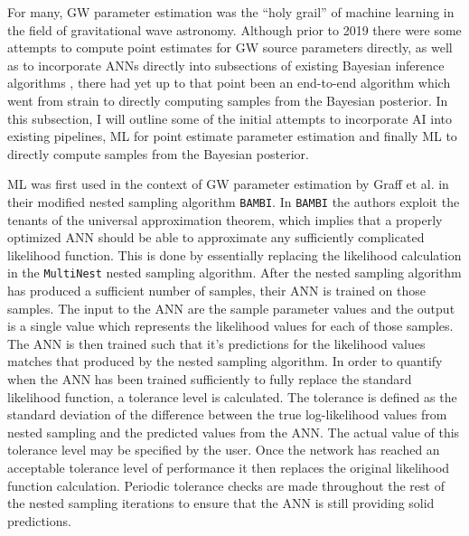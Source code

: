 %
%

For many, \ac{GW} parameter estimation was the ``holy grail'' of machine learning in the field of gravitational wave astronomy. Although prior to 2019 there were some attempts to compute point estimates for \ac{GW} source parameters directly, as well as to incorporate \ac{ANN}s directly into subsections of existing Bayesian inference algorithms \cite{10.1111/j.1365-2966.2011.20288.x}, there had yet up to that point been an end-to-end algorithm which went from strain to directly computing samples from the Bayesian posterior. In this subsection, I will outline some of the initial attempts to incorporate AI into existing pipelines, \ac{ML} for point estimate parameter estimation and finally \ac{ML} to directly compute samples from the Bayesian posterior.

%

\ac{ML} was first used in the context of \ac{GW} parameter estimation by Graff et al. in their modified nested sampling algorithm \texttt{BAMBI}. In \texttt{BAMBI} the authors exploit the tenants of the universal approximation theorem, which implies that a properly optimized \ac{ANN} should be able to approximate any sufficiently complicated likelihood function. This is done by essentially replacing the likelihood calculation in the \texttt{MultiNest} nested sampling algorithm. After the nested sampling algorithm has produced a sufficient number of samples, their \ac{ANN} is trained on those samples. The input to the \ac{ANN} are the sample parameter values and the output is a single value which represents the likelihood values for each of those samples. The \ac{ANN} is then trained such that it's predictions for the likelihood values matches that produced by the nested sampling algorithm. In order to quantify when the \ac{ANN} has been trained sufficiently to fully replace the standard likelihood function, a tolerance level is calculated. The tolerance is defined as the standard deviation of the difference between the true log-likelihood values from nested sampling and the predicted values from the \ac{ANN}. The actual value of this tolerance level may be specified by the user. Once the network has reached an acceptable tolerance level of performance it then replaces the original likelihood function calculation. Periodic tolerance checks are made throughout the rest of the nested sampling iterations to ensure that the \ac{ANN} is still providing solid predictions.

